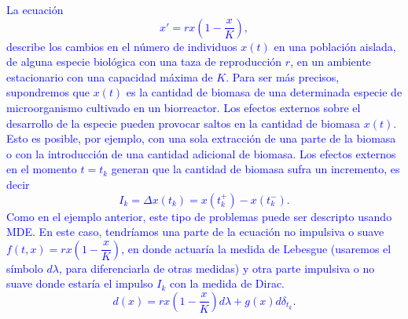 \begin{example}\label{ejemplo2}
\textcolor{blue}{La ecuación 
\begin{equation}\label{ec:biomasa}
    x'=rx\left(1-\dfrac{x}{K}\right),
\end{equation}
describe los cambios en el número de individuos $x(t)$ en una población aislada, de alguna especie biológica con una taza de reproducción $r$, en un ambiente estacionario con una capacidad máxima de $K$. Para ser más precisos, supondremos que $x(t)$ es la cantidad de biomasa de una determinada especie de microorganismo cultivado en un biorreactor. Los efectos externos sobre el desarrollo de la especie pueden provocar saltos en la cantidad de biomasa $x(t)$. Esto es posible, por ejemplo, con una sola extracción de una parte de la biomasa o con la introducción de una cantidad adicional de biomasa. Los  efectos externos en el momento $t=t_k$ generan que la  cantidad de biomasa sufra un incremento, es decir 
$$I_k=\Delta x(t_k)=x(t_k^+)-x(t_k^-).$$
Como en el ejemplo anterior, este tipo de problemas puede ser descripto usando MDE.
En este caso, tendríamos una parte de la ecuación no impulsiva o suave $f(t,x)=rx\left(1-\dfrac{x}{K}\right)$, en donde actuaría la medida de Lebesgue (usaremos el símbolo $d\lambda$, para diferenciarla de otras medidas) y otra parte impulsiva o no suave donde estaría el impulso $I_k$ con la medida de Dirac.
\begin{equation*}
    d(x)=rx\left(1-\dfrac{x}{K}\right)d\lambda +g(x)d\delta_{t_k}.
\end{equation*}}
\end{example}






